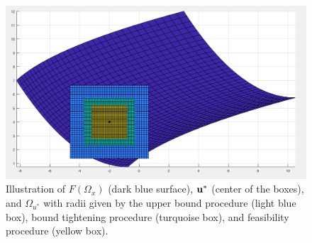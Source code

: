 \begin{figure}[htp!]
  \begin{center}
    \includegraphics[scale=0.5425]{Figures/newex} %
  \end{center}
  \caption{\label{fig:FOmega}
    Illustration of $F(\Omega_x)$ (dark blue surface), $\mathbf{u}^*$ (center of the boxes), and $\Omega_{u^*}$  with radii given by the upper bound procedure (light blue box), bound tightening procedure (turquoise box), and feasibility procedure (yellow box).
  }
\end{figure}

